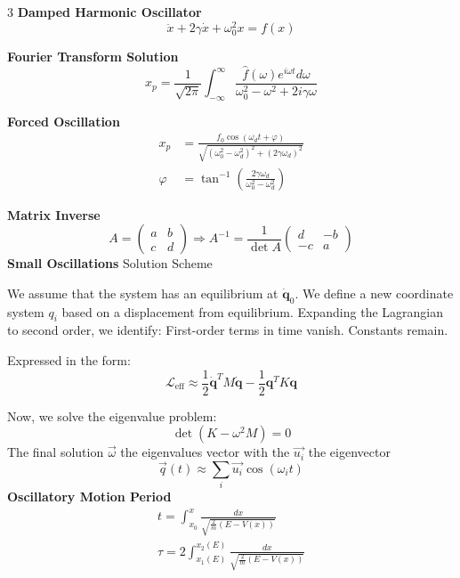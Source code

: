 \documentclass[1pt]{article}
\begin{document}
\begin{multicols}{3}
\textbf{Damped Harmonic Oscillator}
\begin{equation*}
    \ddot{x} + 2\gamma\dot{x} + \omega_0^2 x = f(x)
\end{equation*}

\textbf{Fourier Transform Solution}
\begin{equation*}
    x_p = \frac{1}{\sqrt{2\pi}} \int_{-\infty}^{\infty} \frac{\hat{f}(\omega) e^{i\omega t} d\omega}{\omega_0^2 - \omega^2 + 2i\gamma\omega}
\end{equation*}

\textbf{Forced Oscillation}
\begin{align}
    x_p &= \frac{f_0 \cos(\omega_d t + \varphi)}{\sqrt{(\omega_0^2 - \omega_d^2)^2 + (2\gamma\omega_d)^2}} \\
    \varphi &= \tan^{-1} \left( \frac{2\gamma\omega_d}{\omega_0^2 - \omega_d^2} \right)
\end{align}

\textbf{Matrix Inverse}
\begin{equation*}
    A = \begin{pmatrix} a & b \\ c & d \end{pmatrix} \Rightarrow A^{-1} = \frac{1}{\det A} \begin{pmatrix} d & -b \\ -c & a \end{pmatrix}
\end{equation*}
\textbf{Small Oscillations} Solution Scheme

We assume that the system has an equilibrium at $\dot{\mathbf{q}}_0$. We define a new coordinate system $q_i$ based on a displacement from equilibrium. Expanding the Lagrangian to second order, we identify:
First-order terms in time vanish. Constants remain.

Expressed in the form:
\[
\mathcal{L}_{\text{eff}} \approx \frac{1}{2} \dot{\mathbf{q}}^T M \dot{\mathbf{q}} - \frac{1}{2} \mathbf{q}^T K \mathbf{q}
\]

Now, we solve the eigenvalue problem:
\[
\det \left( K - \omega^2 M \right) = 0
\]
The final solution $\vec{\omega}$ the eigenvalues vector with the $\vec{u_i}$ the eigenvector
\[\vec{q}(t)\approx\sum_i \vec{u_i}\cos(\omega_it)\]
\textbf{Oscillatory Motion Period}
\begin{align*}
        t = \int_{x_0}^{x} \frac{dx}{\sqrt{\frac{2}{m} (E - V(x))}} \\
        \tau = 2 \int_{x_1(E)}^{x_2(E)} \frac{dx}{\sqrt{\frac{2}{m} (E - V(x))}}
\end{align*}




\end{multicols}
\end{document}
